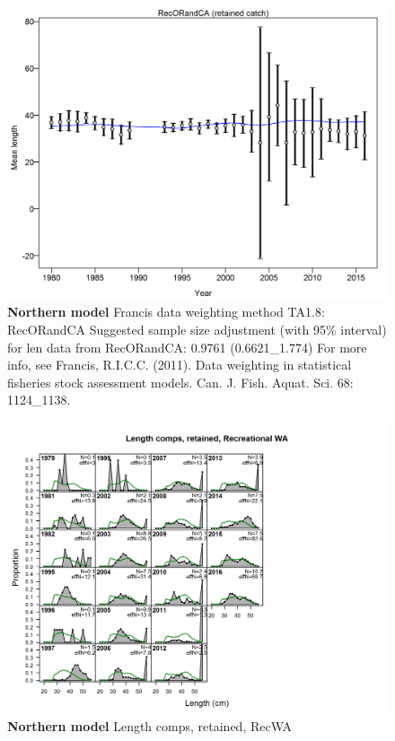 \documentclass[12pt,]{article}
\begin{document}
\begin{figure}[htbp]
\centering
\includegraphics{./r4ss/plots_mod1/comp_lenfit_data_weighting_TA1.8_RecORandCA.png}
\caption{\textbf{Northern model} Francis data weighting method TA1.8:
RecORandCA Suggested sample size adjustment (with 95\% interval) for len
data from RecORandCA: 0.9761 (0.6621\_1.774) For more info, see Francis,
R.I.C.C. (2011). Data weighting in statistical fisheries stock
assessment models. Can. J. Fish. Aquat. Sci. 68: 1124\_1138.
\label{fig:mod1_17_comp_lenfit_data_weighting_TA1.8_RecORandCA}}
\end{figure}

\begin{figure}[htbp]
\centering
\includegraphics{./r4ss/plots_mod1/comp_lenfit_flt4mkt2.png}
\caption{\textbf{Northern model} Length comps, retained, RecWA
\label{fig:mod1_18_comp_lenfit_flt4mkt2}}
\end{figure}
\end{document}
